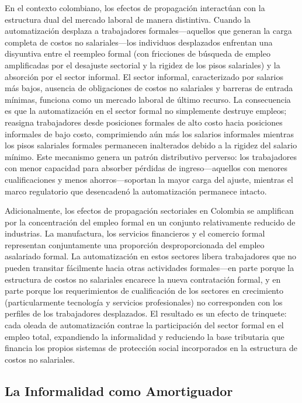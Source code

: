 \documentclass{article}
\begin{document}
En el contexto colombiano, los efectos de propagaci\'on interact\'uan con la estructura dual del mercado laboral de manera distintiva. Cuando la automatizaci\'on desplaza a trabajadores formales---aquellos que generan la carga completa de costos no salariales---los individuos desplazados enfrentan una disyuntiva entre el reempleo formal (con fricciones de b\'usqueda de empleo amplificadas por el desajuste sectorial y la rigidez de los pisos salariales) y la absorci\'on por el sector informal. El sector informal, caracterizado por salarios m\'as bajos, ausencia de obligaciones de costos no salariales y barreras de entrada m\'inimas, funciona como un mercado laboral de \'ultimo recurso. La consecuencia es que la automatizaci\'on en el sector formal no simplemente destruye empleos; reasigna trabajadores desde posiciones formales de alto costo hacia posiciones informales de bajo costo, comprimiendo a\'un m\'as los salarios informales mientras los pisos salariales formales permanecen inalterados debido a la rigidez del salario m\'inimo. Este mecanismo genera un patr\'on distributivo perverso: los trabajadores con menor capacidad para absorber p\'erdidas de ingreso---aquellos con menores cualificaciones y menos ahorros---soportan la mayor carga del ajuste, mientras el marco regulatorio que desencaden\'o la automatizaci\'on permanece intacto.

Adicionalmente, los efectos de propagaci\'on sectoriales en Colombia se amplifican por la concentraci\'on del empleo formal en un conjunto relativamente reducido de industrias. La manufactura, los servicios financieros y el comercio formal representan conjuntamente una proporci\'on desproporcionada del empleo asalariado formal. La automatizaci\'on en estos sectores libera trabajadores que no pueden transitar f\'acilmente hacia otras actividades formales---en parte porque la estructura de costos no salariales encarece la nueva contrataci\'on formal, y en parte porque los requerimientos de cualificaci\'on de los sectores en crecimiento (particularmente tecnolog\'ia y servicios profesionales) no corresponden con los perfiles de los trabajadores desplazados. El resultado es un efecto de trinquete: cada oleada de automatizaci\'on contrae la participaci\'on del sector formal en el empleo total, expandiendo la informalidad y reduciendo la base tributaria que financia los propios sistemas de protecci\'on social incorporados en la estructura de costos no salariales.


\subsection{La Informalidad como Amortiguador}
\label{subsec:informality_theory}
\end{document}

